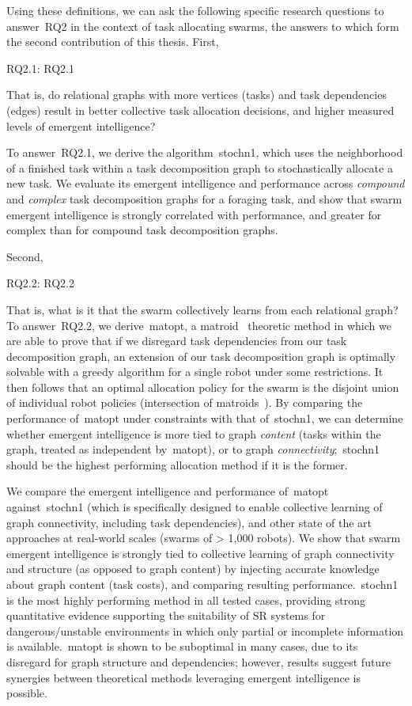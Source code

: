 Using these definitions, we can ask the following specific research questions to
answer~\gls{RQ2} in the context of task allocating swarms, the answers to which
form the second contribution of this thesis. First,

\medskip\noindent
\gls{RQ2.1}: \glsdesc{RQ2.1}
\medskip

\noindent
That is, do relational graphs with more vertices (tasks) and task dependencies
(edges) result in better collective task allocation decisions, and higher
measured levels of emergent intelligence?

To answer~\gls{RQ2.1}, we derive the algorithm~\gls{stochn1}, which uses the
neighborhood of a finished task within a task decomposition graph to
stochastically allocate a new task. We evaluate its emergent intelligence and
performance across \emph{compound} and \emph{complex} task decomposition graphs
for a foraging task, and show that swarm emergent intelligence is strongly
correlated with performance, and greater for complex than for compound task
decomposition graphs.

Second,

\medskip\noindent
\gls{RQ2.2}: \glsdesc{RQ2.2}
\medskip

\noindent
That is, what is it that the swarm collectively learns from each relational
graph?  To answer~\gls{RQ2.2}, we derive~\gls{matopt}, a
matroid~\cite{Tutte1959,Whitney1935,Oxley2006} theoretic method in which we are
able to prove that if we disregard task dependencies from our task decomposition
graph, an extension of our task decomposition graph is optimally solvable with a
greedy algorithm for a single robot under some restrictions. It then follows
that an optimal allocation policy for the swarm is the disjoint union of
individual robot policies (intersection of matroids~\cite{Williams2017}). By
comparing the performance of~\gls{matopt} under constraints with that
of~\gls{stochn1}, we can determine whether emergent intelligence is more tied
to graph \emph{content} (tasks within the graph, treated as independent
by~\gls{matopt}), or to graph \emph{connectivity};~\gls{stochn1} should be the
highest performing allocation method if it is the former.

We compare the emergent intelligence and performance of~\gls{matopt}
against~\gls{stochn1} (which is specifically designed to enable collective
learning of graph connectivity, including task dependencies), and other state of
the art approaches at real-world scales (swarms of > 1,000 robots). We show that
swarm emergent intelligence is strongly tied to collective learning of graph
connectivity and structure (as opposed to graph content) by injecting accurate
knowledge about graph content (task costs), and comparing resulting
performance.~\gls{stochn1} is the most highly performing method in all tested
cases, providing strong quantitative evidence supporting the suitability of SR
systems for dangerous/unstable environments in which only partial or incomplete
information is available.~\gls{matopt} is shown to be suboptimal in many cases,
due to its disregard for graph structure and dependencies; however, results
suggest future synergies between theoretical methods leveraging emergent
intelligence is possible.

